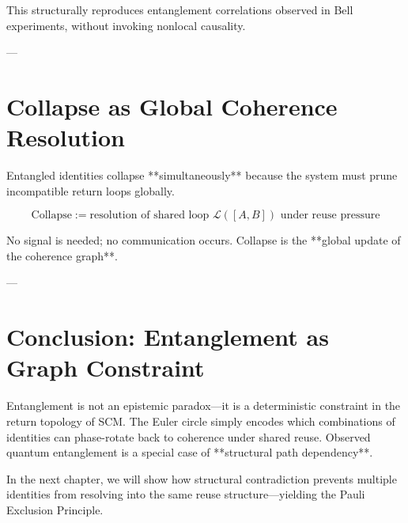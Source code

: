 This structurally reproduces entanglement correlations observed in Bell experiments, without invoking nonlocal causality.

---

\section{Collapse as Global Coherence Resolution}

Entangled identities collapse **simultaneously** because the system must prune incompatible return loops globally.

\[
\text{Collapse} := \text{resolution of shared loop } \mathcal{L}([A,B]) \text{ under reuse pressure}
\]

No signal is needed; no communication occurs. Collapse is the **global update of the coherence graph**.

---

\section{Conclusion: Entanglement as Graph Constraint}

Entanglement is not an epistemic paradox—it is a deterministic constraint in the return topology of SCM. The Euler circle simply encodes which combinations of identities can phase-rotate back to coherence under shared reuse. Observed quantum entanglement is a special case of **structural path dependency**.

In the next chapter, we will show how structural contradiction prevents multiple identities from resolving into the same reuse structure—yielding the Pauli Exclusion Principle.
